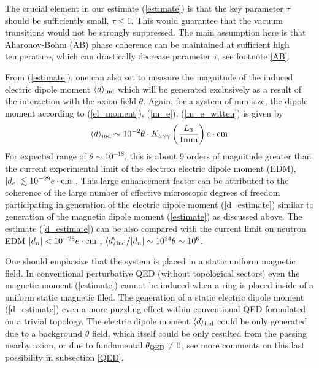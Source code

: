 \documentclass[ twocolumn,aps,prd,   
               preprintnumbers,numbers,sort&compress,nofootinbib,
                            showpacs,superscriptaddress,
               colorlinks,
               linkcolor=blue,   
               citecolor=blue]{revtex4-1}   \newcommand{\exclude}[1]{}
\newcommand{\be}{\begin{eqnarray}}
\newcommand{\ee}{\end{eqnarray}}
\begin{document}
  The crucial  element in our  estimate (\ref{estimate}) is that the key parameter $\tau$ should be sufficiently small, $\tau\leq 1$.  This  
  would guarantee that the vacuum transitions would not be strongly suppressed.  The main assumption here is that Aharonov-Bohm (AB) phase coherence can be maintained at sufficient high temperature,  which can drastically decrease parameter $\tau$, see footnote \ref{AB}.
    
  
From (\ref{estimate}), one can also set to measure the magnitude of the induced electric dipole moment $\langle d\rangle_{\rm ind}$ which will be generated exclusively as a result of the interaction with the axion field $\theta$. Again, for a system of mm size, the dipole moment according to (\ref{el_moment}), (\ref{m_e}), (\ref{m_e_witten})  is given by
\be
\label{d_estimate}
\langle d\rangle_{\rm ind} \sim 10^{-2}\theta \cdot K_{a\gamma\gamma} \left(\frac{L_3}{1 {\rm mm}}\right) e \cdot \rm cm
\ee
For expected range of $\theta\sim 10^{-18}$, this is about 9 orders of magnitude greater than the current experimental limit of the  electron electric dipole moment (EDM), $|d_e|\lesssim 10^{-29} e \cdot \rm cm$  \cite{Hudson:2011zz,Baron:2013eja}. This large enhancement factor  can be attributed to the coherence of the large number of effective microscopic degrees of freedom participating in generation of the electric dipole moment (\ref{d_estimate})  similar to generation of the magnetic dipole moment (\ref{estimate}) 
as discussed above. The estimate  (\ref{d_estimate}) can be also compared with  the current limit on neutron EDM $|d_{n}| < 10^{-26} e \cdot\rm cm$ \cite{Afach:2015sja}, $\langle d\rangle_{\rm ind}/|d_{n}| \sim 10^{24}\theta\sim 10^{6}$.

One should emphasize that the system is placed in a static uniform magnetic field. In conventional perturbative QED (without topological sectors) even the magnetic moment (\ref{estimate}) cannot be induced  when a ring is placed inside of a uniform static magnetic filed. The generation of a static electric dipole moment 
(\ref{d_estimate}) even a  more puzzling effect within conventional  QED formulated on a trivial topology. The electric dipole moment $\langle d\rangle_{\rm ind} $ could be only generated   due to  a background $\theta$ field, which itself  could be only resulted from the passing nearby axion, or due to fundamental $\theta_{\rm QED}\neq 0$, see more comments on this last  possibility in subsection \ref{QED}. 



 
\end{document}
